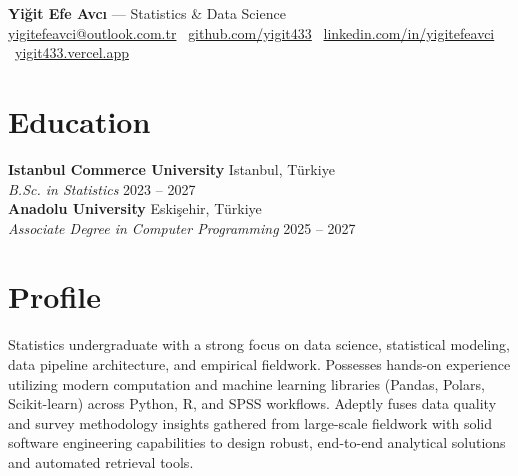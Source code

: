 \documentclass[10pt,a4paper]{extarticle}
\begin{document}
\begin{center}
    \begin{minipage}{\textwidth}
        \centering
        {\LARGE\textbf{Yiğit Efe Avcı}} \hspace{4pt} {\Large --- \hspace{4pt}Statistics \& Data Science}\\[8pt]
        \href{mailto:yigitefeavci@outlook.com.tr}{yigitefeavci@outlook.com.tr} \textbullet\
        \href{https://github.com/yigit433}{github.com/yigit433} \textbullet\
        \href{https://linkedin.com/in/yigitefeavci}{linkedin.com/in/yigitefeavci} \textbullet\
        \href{https://yigit433.vercel.app}{yigit433.vercel.app}
    \end{minipage}
\end{center}

\section{Education}
\textbf{Istanbul Commerce University} \hfill Istanbul, Türkiye\\
\textit{B.Sc. in Statistics} \hfill 2023 -- 2027\\
\textbf{Anadolu University} \hfill Eskişehir, Türkiye\\
\textit{Associate Degree in Computer Programming} \hfill 2025 -- 2027\\

\section{Profile}
Statistics undergraduate with a strong focus on data science, statistical modeling, data pipeline architecture, and empirical fieldwork. Possesses hands-on experience utilizing modern computation and machine learning libraries (Pandas, Polars, Scikit-learn) across Python, R, and SPSS workflows. Adeptly fuses data quality and survey methodology insights gathered from large-scale fieldwork with solid software engineering capabilities to design robust, end-to-end analytical solutions and automated retrieval tools.
\end{document}
